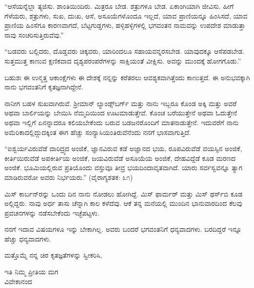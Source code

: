 “ಆಸೆಯನ್ನೆಲ್ಲಾ ತ್ಯಜಿಸು. ಶಾಂತಿಯಿಂದಿರು. ಮಿತ್ರರೂ ಬೇಡ. ಶತ್ರುಗಳೂ ಬೇಡ. ಏಕಾಂಗಿಯಾಗಿ ಜೀವಿಸು. ಹೀಗೆ ಗೆಳೆಯರು, ಶತ್ರುಗಳು, ಸುಖ, ದುಃಖ, ಆಸೆ, ಅಸೂಯೆಗಳೊಂದೂ ಇಲ್ಲದೆ, ಯಾವ ಪ್ರಾಣಿಯನ್ನೂ ಹಿಂಸಿಸದೆ, ಯಾವ ಪ್ರಾಣಿಯ ಹಿಂಸೆಗೂ ಕಾರಣವಾಗದೆ, ಬೆಟ್ಟಗುಡ್ಡಗಳು, ಹಳ್ಳಿಹಳ್ಳಿಗಳಲ್ಲಿ ಭಗವಂತನ ನಾಮವನ್ನು ಉಪದೇಶ ಮಾಡುತ್ತಾ ನಾವು ಸಂಚರಿಸುತ್ತಿರುವೆವು.”

\vspace{0.1cm}

“ಬಡವರು ಬಲ್ಲಿದರು, ದೊಡ್ಡವರು ಚಿಕ್ಕವರು, ಯಾರಿಂದಲೂ ಸಹಾಯವನ್ನರಸಬೇಡ. ಯಾವುದಕ್ಕೂ ಆಸೆಪಡಬೇಡ. ಸುತ್ತಮುತ್ತ ಕಾಣುವ ಕ್ಷಣಿಕವಾದ ದೃಶ್ಯಪರಂಪರೆಗಳನ್ನು ಸಾಕ್ಷಿಯಂತೆ ವೀಕ್ಷಿಸು. ಅವನ್ನು ಮುಂದಕ್ಕೆ ಹೋಗಗೊಡು.”

\vspace{0.15cm}

ಬಹುಶಃ ಈ ಉನ್ಮತ್ತ ಆಕಾಂಕ್ಷೆಗಳು ಈ ದೇಶಕ್ಕೆ ನನ್ನನ್ನು ಕರೆತರಲು ಆವಶ್ಯಕವಾಗಿತ್ತೆಂದು ಕಾಣುತ್ತದೆ. ಈ ಅನುಭವಕ್ಕಾಗಿ ನಾನು ಭಗವಂತನಿಗೆ ಕೃತಜ್ಞನಾಗಿದ್ದೇನೆ.

\vspace{0.15cm}

ನಾನೀಗ ಬಹಳ ಸುಖವಾಗಿರುವೆ. ಶ‍್ರೀಮಾನ್ ಲ್ಯಾಂಡ್ಸ್‌ಬರ್ಗ್ ಮತ್ತು ನಾನು ಇಬ್ಬರೂ ಕೊಂಡ ಅಕ್ಕಿ ಮತ್ತು ಅವರೆ ಅಥವಾ ಬಾರ್ಲಿಯನ್ನು ಬೇಯಿಸಿ ನೆಮ್ಮದಿಯಿಂದ ಊಟಮಾಡುತ್ತೇವೆ. ಕೊಂಚ ಬರೆಯುತ್ತೇನೆ ಅಥವಾ ಓದುತ್ತೇನೆ ಅಥವಾ ಇಲ್ಲಿಗೆ ಏನನ್ನಾದರೂ ಕಲಿಯಬೇಕೆಂದು ಬರುವ ಬಡಜನರೊಂದಿಗೆ ಮಾತನಾಡುತ್ತೇನೆ. ಇದುವರೆಗೆ ನಾನು ಅಮೆರಿಕಾದಲ್ಲಿದ್ದುದಕ್ಕಿಂತ ಈಗ ಹೆಚ್ಚು ಸಂನ್ಯಾಸಿಯಂತಿರುವೆನೆಂದು ನನಗೆ ಭಾಸವಾಗುತ್ತಿದೆ.

\vspace{0.15cm}

“ಐಶ್ವರ್ಯವಿರುವೆಡೆ ದಾರಿದ್ರ್ಯದ ಅಂಜಿಕೆ, ಜ್ಞಾನವಿರುವ ಕಡೆ ಅಜ್ಞಾನದ ಭಯ, ರೂಪವಿರುವೆಡೆ ವಯಸ್ಸಿನ ಅಂಜಿಕೆ, ಕೀರ್ತಿಯಿರುವೆಡೆ ಅಪಕೀರ್ತಿಯ ಅಂಜಿಕೆ, ಜಯವಿರುವೆಡೆ ಅಸೂಯೆಯ ಅಂಜಿಕೆ, ದೇಹವಿದ್ದೆಡೆ ಕೂಡ ಮರಣದ ಅಂಜಿಕೆ. ಭೂಮಿಯಲ್ಲಿರುವ ಪ್ರತಿಯೊಂದು ವಸ್ತುವೂ ತೀವ್ರ ಭಯದಿಂದಾವೃತವಾಗಿದೆ. ಯಾರು ಸರ್ವಸ್ವವನ್ನೂ ತ್ಯಾಗ ಮಾಡಿರುವರೋ ಅವರು ನಿರ್ಭಯರು.” (ವೈರಾಗ್ಯಶತಕ: ೩೧)

\vspace{0.15cm}

ಮಿಸ್ ಕಾರ್ಬನ್‌ರನ್ನು ಒಂದು ದಿನ ನಾನು ನೋಡಲು ಹೋಗಿದ್ದೆ. ಮಿಸ್ ಫಾರ್ಮರ್‌ ಮತ್ತು ಮಿಸ್ ಥರ್ಸ್‌ಬಿ ಕೂಡ ಅಲ್ಲಿದ್ದರು. ನಾವು ಅರ್ಧ ತಾಸು ಚೆನ್ನಾಗಿ ಕಾಲ ಕಳೆದೆವು. ಆಕೆ ತನ್ನ ಮನೆಯಲ್ಲಿ ಮುಂದಿನ ಭಾನುವಾರದಿಂದ ಕೆಲವು ಪ್ರವಚನಗಳನ್ನು ನಡೆಸಬೇಕೆಂದು ಇಚ್ಛೆಪಟ್ಟಳು.

\vspace{0.15cm}
ನನಗೆ ಇದಾವ ವಿಷಯಗಳೂ ಇನ್ನು ಬೇಕಾಗಿಲ್ಲ. ಅವರು ಬಂದರೆ ಭಗವಂತನಿಗೆ ಧನ್ಯವಾದಗಳು. ಬರದಿದ್ದರೆ ಇನ್ನೂ ಹೆಚ್ಚು ಧನ್ಯವಾದಗಳು.

\vspace{0.15cm}

ಮತ್ತೊಮ್ಮೆ ನನ್ನ ಚಿರ ಕೃತಜ್ಞತೆಗಳನ್ನು ಸ್ವೀಕರಿಸಿ,

{\flushright
ಇತಿ ನಿಮ್ಮ ಪ್ರೀತಿಯ ಮಗ\\ವಿವೇಕಾನಂದ\par}

